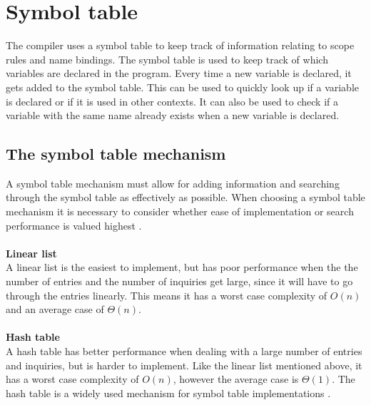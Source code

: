 \chapter{Symbol table}\label{ch:symboltable}
The compiler uses a symbol table to keep track of information relating to scope rules and name bindings.
The symbol table is used to keep track of which variables are declared in the program. 
Every time a new variable is declared, it gets added to the symbol table. 
This can be used to quickly look up if a variable is declared or if it is used in other contexts. 
It can also be used to check if a variable with the same name already exists when a new variable is declared.

\section{The symbol table mechanism}
A symbol table mechanism must allow for adding information and searching through the symbol table as effectively as possible.
When choosing a symbol table mechanism it is necessary to consider whether ease of implementation or search performance is valued highest \cite{Dragon}.
\\\\
\textbf{Linear list}
\\
A linear list is the easiest to implement, but has poor performance when the the number of entries and the number of inquiries get large, since it will have to go through the entries linearly. 
This means it has a worst case complexity of $O(n)$ and an average case of $\Theta(n)$. 
\\\\
\textbf{Hash table}
\\
A hash table has better performance when dealing with a large number of entries and inquiries, but is harder to implement. Like the linear list mentioned above, it has a worst case complexity of $O(n)$, however the average case is $\Theta(1)$.
The hash table is a widely used mechanism for symbol table implementations \cite{CraftinfACompiler}.

